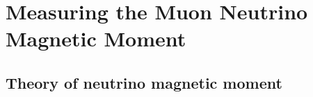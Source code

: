 \chapter{Measuring the Muon Neutrino Magnetic Moment}\label{sec:NeutrinoMagMoment}




\section{Theory of neutrino magnetic moment}


